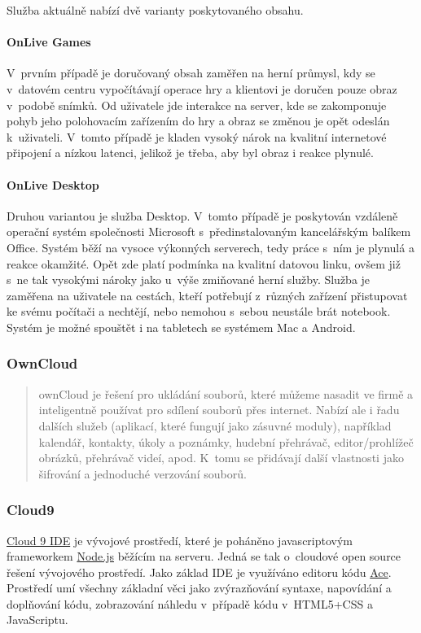 Služba aktuálně nabízí dvě varianty poskytovaného obsahu.

\paragraph{OnLive Games}
V~prvním případě je doručovaný obsah zaměřen na herní průmysl, kdy se v~datovém centru vypočítávají operace hry a klientovi je doručen pouze obraz v~podobě snímků.
Od uživatele jde interakce na server, kde se zakomponuje pohyb jeho polohovacím zařízením do hry a obraz se změnou je opět odeslán k~uživateli. V~tomto případě je kladen vysoký nárok na kvalitní internetové připojení a nízkou latenci, jelikož je třeba, aby byl obraz i reakce plynulé.
\paragraph{OnLive Desktop}
Druhou variantou je služba Desktop. V~tomto případě je poskytován vzdáleně operační systém společnosti Microsoft s~předinstalovaným kancelářským balíkem Office. Systém běží na vysoce výkonných serverech, tedy práce s~ním je plynulá a reakce okamžité. Opět zde platí podmínka na kvalitní datovou linku, ovšem již s~ne tak vysokými nároky jako u~výše zmiňované herní služby. Služba je zaměřena na uživatele na cestách, kteří potřebují z~různých zařízení přistupovat ke svému počítači a nechtějí, nebo nemohou s~sebou neustále brát notebook. Systém je možné spouštět i na tabletech se systémem Mac a Android.

\subsubsection{OwnCloud}
\begin{quote}ownCloud je řešení pro ukládání souborů, které můžeme nasadit ve firmě a inteligentně používat pro sdílení souborů přes internet. Nabízí ale i řadu dalších služeb (aplikací, které fungují jako zásuvné moduly), například kalendář, kontakty, úkoly a poznámky, hudební přehrávač, editor/prohlížeč obrázků, přehrávač videí, apod. K~tomu se přidávají další vlastnosti jako šifrování a jednoduché verzování souborů.\cite{samuraj:ownCLoud5}
\end{quote}

\subsubsection{Cloud9}
\href{https://github.com/ajaxorg/cloud9}{Cloud 9 IDE} je vývojové prostředí, které je poháněno javascriptovým frameworkem \href{http://nodejs.org/}{Node.js} běžícím na serveru. Jedná se tak o~cloudové open source řešení vývojového prostředí. Jako základ IDE je využíváno editoru kódu \href{http://ace.c9.io/}{Ace}. Prostředí umí všechny základní věci jako zvýrazňování syntaxe, napovídání a doplňování kódu, zobrazování náhledu v~případě kódu v~HTML5+CSS a JavaScriptu.

